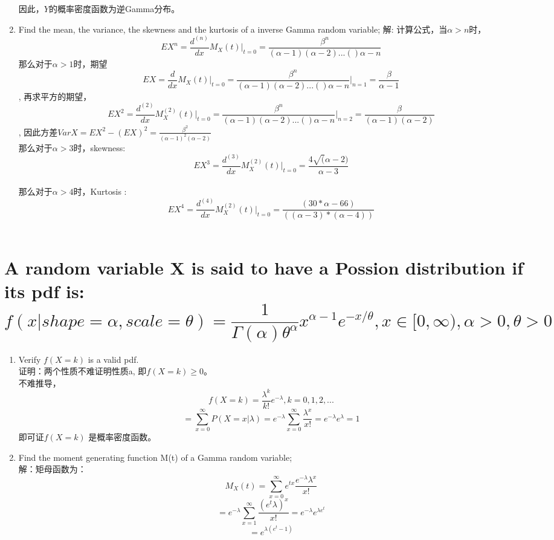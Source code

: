 \documentclass [12pt]{article}
\begin{document}
\begin{CJK*}{GBK}{kai}
\begin{enumerate}
      		因此，$Y$的概率密度函数为逆Gamma分布。
		
		
	\item[(f)] Find the mean, the variance, the skewness and the kurtosis of a inverse Gamma random variable;
		解: 
		计算公式，当$\alpha >n$时，
		$$EX^n=\frac{d^{(n)}}{dx}M_{X}(t)\vert_{t=0}=\frac{\beta^n}{(\alpha-1)(\alpha-2)...()\alpha-n}$$
		那么对于$\alpha >1$时，期望$$EX=\frac{d}{dx}M_{X}(t)\vert_{t=0}=\frac{\beta^n}{(\alpha-1)(\alpha-2)...()\alpha-n}\vert_{n=1}=\frac{\beta}{\alpha-1}$$,
      		再求平方的期望，$$EX^2=\frac{d^{(2)}}{dx}M_{X}^{(2)}(t)\vert_{t=0}=\frac{\beta^n}{(\alpha-1)(\alpha-2)...()\alpha-n}\vert_{n=2}=\frac{\beta}{(\alpha-1)(\alpha-2)}$$,
		因此方差$VarX=EX^2-(EX)^2 =\frac{\beta^2}{(\alpha-1)^2(\alpha-2)}$\\
		那么对于$\alpha >3$时，skewness:$$EX^3=\frac{d^{(3)}}{dx}M_{X}^{(2)}(t)\vert_{t=0}=\frac{4 \sqrt (\alpha -2) }{\alpha-3}$$\\
		那么对于$\alpha >4$时，Kurtosis : $$EX^4=\frac{d^{(4)}}{dx}M_{X}^{(2)}(t)\vert_{t=0}= \frac{(30 * \alpha - 66) }{((\alpha-3)*(\alpha - 4)) } $$\\
		
      \end{enumerate}

\section{A random variable X is said to have a Possion distribution if its pdf is: \\
     $$f(x|shape=\alpha,scale=\theta)=\frac{1}{\Gamma(\alpha)\theta^\alpha}x^{\alpha-1}e^{-x/\theta},x \in [0,\infty), \alpha >0,\theta>0$$}
\begin{enumerate}      
	\item[(a)] Verify $f(X=k)$ is a valid pdf.\\
		证明：两个性质不难证明性质a, 即$f(X=k) \ge 0$。\\
      		不难推导，$$f(X=k)=\frac{\lambda^k}{k!}e^{-\lambda},k=0,1,2,... $$
		$$= \sum_{x=0}^{\infty}P(X=x|\lambda)=e^{-\lambda}\sum_{x=0}^{\infty}\frac{\lambda^x}{x!}=e^{-\lambda} e^\lambda=1$$ 
		即可证$f(X=k)$ 是概率密度函数。
	\item[(b)] Find the moment generating function M(t) of a Gamma random variable;\\
		解：矩母函数为：
		$$M_{X}(t)= \sum_{x=0}^{\infty}e^{tx}\frac{e^{-\lambda}\lambda^x}{x!}$$
		$$=e^{-\lambda}\sum_{x=1}^{\infty}\frac{(e^t\lambda)^x}{x!}=e^{-\lambda} e^{\lambda e^t}$$
		$$=e^{\lambda(e^t-1)}$$
		

\end{enumerate}
\end{CJK*}
\end{document}
